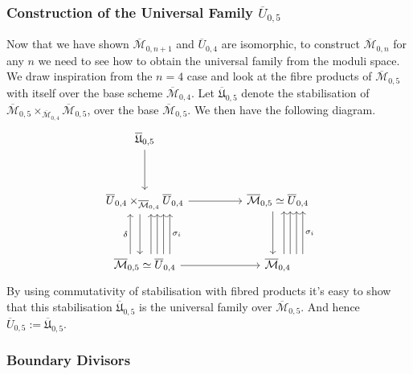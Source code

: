\subsubsection{Construction of the Universal Family $\overline{U}_{0,5}$}
Now that we have shown $\overline{\mathcal{M}}_{0,n+1}$ and $\overline{U}_{0,4}$ are isomorphic, to construct $\overline{\mathcal{M}}_{0,n}$ for any $n$ we need to see how to obtain the universal family from the moduli space.
We draw inspiration from the $n=4$ case and look at the fibre products of $\overline{\mathcal{M}}_{0,5}$ with itself over the base scheme $\overline{\mathcal{M}}_{0,4}$.
Let $\overline{\mathfrak{U}}_{0,5}$ denote the stabilisation of $\overline{\mathcal{M}}_{0,5} \times_{\overline{\mathcal{M}}_{0,4}} \overline{\mathcal{M}}_{0,5}$, over the base $\overline{\mathcal{M}}_{0,5}$. 
We then have the following diagram.
\[
\begin{tikzcd}
    \overline{\mathfrak{U}}_{0,5} & & \\
    \\
    \overline{U}_{0,4} \times_{\overline{\mathcal{M}}_{0,4}} \overline{U}_{0,4} & & \overline{\mathcal{M}}_{0,5} \simeq \overline{U}_{0,4} \\
    \\
    \overline{\mathcal{M}}_{0,5} \simeq \overline{U}_{0,4} & & \overline{\mathcal{M}}_{0,4}
    \arrow[from = 1-1, to = 3-1]
    \arrow[from = 3-1, to = 3-3]
    \arrow[from = 3-1, to = 5-1, xshift = -1ex]
    \arrow[from = 5-1, to = 5-3]
    \arrow[from = 3-3, to = 5-3, xshift = -1ex]
    \arrow[from = 5-1, to = 3-1, xshift = 1.3ex]
    \arrow[from = 5-1, to = 3-1, xshift = 2.6ex]
    \arrow[from = 5-1, to = 3-1, xshift = 3.9ex]
    \arrow[swap, "\sigma_{i}",from = 5-1, to = 3-1, xshift = 5.2ex]
    \arrow["\delta", from = 5-1, to = 3-1, xshift = -3ex]
    \arrow[from = 5-3, to = 3-3, xshift = 1.3ex]
    \arrow[from = 5-3, to = 3-3, xshift = 2.6ex]
    \arrow[from = 5-3, to = 3-3, xshift = 3.9ex]
    \arrow[swap, "\sigma_{i}",from = 5-3, to = 3-3, xshift = 5.2ex]
\end{tikzcd}
\]
By using commutativity of stabilisation with fibred products it's easy to show that this stabilisation $\overline{\mathfrak{U}}_{0,5}$ is the universal family over $\overline{\mathcal{M}}_{0,5}$.
And hence $\overline{U}_{0,5}:=\overline{\mathfrak{U}}_{0,5}$.
\subsubsection{Boundary Divisors}

